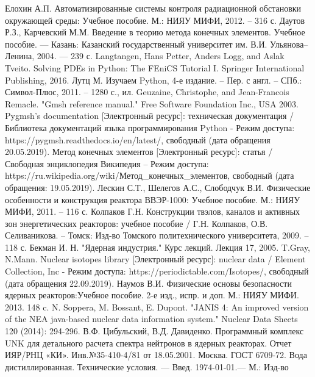 \begin{thebibliography}{99}
	 Елохин А.П. Автоматизированные системы контроля радиационной обстановки окружающей среды: 
		Учебное пособие. М.: НИЯУ МИФИ, 2012. – 316 с.
	 Даутов Р.З., Карчевский М.М. Введение в теорию метода конечных элементов. Учебное пособие. — Казань: 
		Казанский государственный университет им. В.И. Ульянова–Ленина, 2004. — 239 с.
	 Langtangen, Hans Petter, Anders Logg, and Aslak Tveito. Solving PDEs in Python: The FEniCS 
		Tutorial I. Springer International Publishing, 2016.
	 Лутц М. Изучаем Python, 4-е издание. – Пер. с англ. – СПб.: Символ-Плюс, 2011. – 1280 с., ил.
	 Geuzaine, Christophe, and Jean-Francois Remacle. "Gmsh reference manual." Free Software 
		Foundation Inc., USA 2003.
	 Pygmsh's documentation [Электронный ресурс]: техническая документация / Библиотека документаций 
		языка программирования Python - Режим доступа: https://pygmsh.readthedocs.io/en/latest/, свободный (дата 
		обращения 20.05.2019).
	 Метод конечных элементов [Электронный ресурс]: статья / Свободная энциклопедия Википедия – Режим 
		доступа: https://ru.wikipedia.org/wiki/Метод\_конечных\_элементов, свободный (дата обращения: 19.05.2019).
	 Лескин С.Т., Шелегов А.С., Слободчук В.И. Физические особенности и конструкция реактора 
		ВВЭР-1000: Учебное пособие. М.: НИЯУ МИФИ, 2011. – 116 с.
	 Колпаков Г.Н. Конструкции твэлов, каналов и активных зон энергетических реакторов: учебное 
		пособие / Г.Н. Колпаков, О.В. Селиваникова. – Томск: Изд-во Томского политехнического университета, 2009. 
		– 118 с. 
	 Бекман И. Н. "Ядерная индустрия." Курс лекций. Лекция 17, 2005.
	 T.Gray, N.Mann. Nuclear isotopes library [Электронный ресурс]: nuclear data / Element Collection, 
		Inc - Режим доступа: https://periodictable.com/Isotopes/, свободный (дата обращения 22.09.2019).
	 Наумов В.И. Физические основы безопасности ядерных реакторов:Учебное пособие. 2-е изд., испр. 
		и доп. М.: НИЯУ МИФИ. 2013. 148 c.
	 N. Soppera, M. Bossant, E. Dupont. "JANIS 4: An improved version of the NEA java-based nuclear data 
		information system." Nuclear Data Sheets 120 (2014): 294-296.
	 В.Ф. Цибульский, В.Д. Давиденко. Программный комплекс UNK для детального расчета спектра нейтронов в 
		ядерных реакторах. Отчет ИЯР/РНЦ «КИ». Инв.№35-410-4/81 от 18.05.2001. Москва.
	 ГОСТ 6709-72. Вода дистиллированная. Технические условия. — Введ. 1974-01-01.— М.: Изд-во 

\end{thebibliography}
